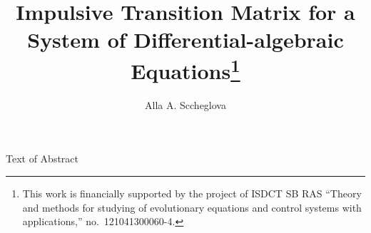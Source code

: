 \title{Impulsive Transition Matrix for a System of Differential-algebraic Equations\thanks{This work is financially supported by the project of ISDCT SB RAS ``Theory and methods for studying  of evolutionary equations and control systems with applications,'' no.~121041300060-4.}}
\author{Alla A. Sccheglova}


\maketitle

\begin{abstract}
\end{abstract}


Text of Abstract


\begin{thebibliography}{9}
\end{thebibliography}

